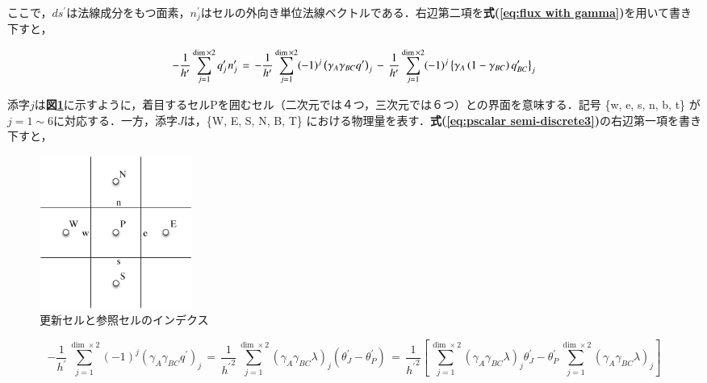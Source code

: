 \noindent ここで，$ds^{\prime}$は法線成分をもつ面素，$n_{j}^{\prime}$はセルの外向き単位法線ベクトルである．右辺第二項を\textbf{式(\ref{eq:flux with gamma})}を用いて書き下すと，

\begin{equation}
- \frac{1}{h^{\prime}} \sum\limits_{j=1}^{\dim\times2} q_{j}^{\prime} \hspace{0.1em} n_{j}^{\prime}
\,=\,
- \frac{1}{h^{\prime}} \sum\limits_{j=1}^{\dim\times2} (-1)^{j} \left( \gamma_{A}\gamma_{BC} q^{\prime} \right)_{j} 
\,-\, 
\frac{1}{h^{\prime}} \sum\limits_{j=1}^{\dim\times2} (-1)^{j} \left\{ \gamma_{A} \left( 1-\gamma_{BC}\right) q_{BC}^{\prime} \right\}_{j}
\label{eq:pscalar semi-discrete3}
\end{equation}

\noindent 添字$j$は\textbf{図\ref{fig:cell index}}に示すように，着目するセルPを囲むセル（二次元では４つ，三次元では６つ）との界面を意味する．記号 \{w, e, s, n, b, t\} が $j=1\sim6$に対応する．一方，添字$J$は，\{W, E, S, N, B, T\} における物理量を表す．\textbf{式(\ref{eq:pscalar semi-discrete3})}の右辺第一項を書き下すと，

\begin{figure}[htdp]
\begin{center}
\includegraphics[width=5cm,clip]{index.eps}
\caption{更新セルと参照セルのインデクス}
\label{fig:cell index}
\end{center}
\end{figure}

\begin{equation}
- \frac{1}{h^{\prime}} \sum\limits_{j=1}^{\dim\times2} (-1)^{j} \left( \gamma_{A}\gamma_{BC} q^{\prime} \right)_{j}
\,=\,
\frac{1}{{h^{\prime}}^{2}} \sum\limits_{j=1}^{\dim\times2} \left( \gamma_{A}\gamma_{BC} \lambda \right)_{j} \left( \theta_{J}^{\prime} - \theta_{P}^{\prime} \right)
\,=\,
\frac{1}{{h^{\prime}}^{2}} \left[ \sum\limits_{j=1}^{\dim\times2} \left( \gamma_{A}\gamma_{BC} \lambda \right)_{j} \theta_{J}^{\prime} - 
\theta_{P}^{\prime} \sum\limits_{j=1}^{\dim\times2} \left( \gamma_{A}\gamma_{BC} \lambda \right)_{j} \right]
\label{eq:pscalar semi-discrete4}
\end{equation}

